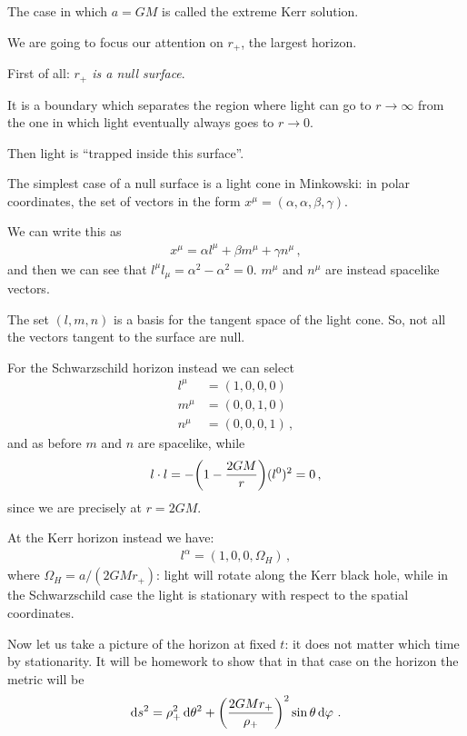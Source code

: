 \documentclass[main.tex]{subfiles}
\begin{document}
The case in which \(a = GM\) is called the extreme Kerr solution. 

We are going to focus our attention on \(r_{+}\), the largest horizon. 

First of all: \emph{$r_{+}$ is a null surface}. 

It is a boundary which separates the region where light can go to \(r \rightarrow \infty \) from the one in which light eventually always goes to \(r \rightarrow 0\). 

Then light is ``trapped inside this surface''.

The simplest case of a null surface  is a light cone in Minkowski: in polar coordinates, the set of vectors in the form \(x^{\mu } = (\alpha , \alpha , \beta , \gamma )\).

We can write this as 
%
\begin{align}
  x^{\mu } = \alpha l^{\mu } + \beta m^{\mu } + \gamma n^{\mu }
\,,
\end{align}
%
and then we can see that \(l^{\mu } l_{\mu } = \alpha^2 - \alpha^2 = 0\). \(m^{\mu } \) and \(n^{\mu }\) are instead spacelike vectors. 

The set \((l, m, n)\) is  a basis for the tangent space of the light cone. 
So, not all the vectors tangent to the surface are null. 

For the Schwarzschild horizon instead we can select 
%
\begin{align}
  l^{\mu } &= (1, 0, 0, 0)  \\
  m^{\mu } &= (0,0,1, 0)  \\
  n^{\mu } &= (0,0,0, 1)
\,,
\end{align}
%
and as before \(m\) and \(n\) are spacelike, while 
%
\begin{align}
  l \cdot l = - \qty(1 - \frac{2GM}{r}) (l^{0})^2 = 0 
\,,
\end{align}
%
since we are precisely at \(r = 2GM\). 

At the Kerr horizon instead we have: 
%
\begin{align}
  l^{\alpha } = (1, 0, 0, \Omega_{H})
\,,
\end{align}
%
where  \(\Omega_{H}= a / (2GMr_+)\): light will rotate along the Kerr black hole, while in the Schwarzschild case the light is stationary with respect to the spatial coordinates. 

Now let us take a picture of the horizon at fixed \(t\): 
it does not matter which time by stationarity. It will be homework to show that in that case on the horizon the metric will be 
%
\begin{align}
\dd{s^2} = \rho_{+}^2 \dd{\theta^2} + \qty(\frac{2GMr_+}{\rho_{+}})^2 \sin \theta \dd{\varphi }
\,.
\end{align}
\end{document}
